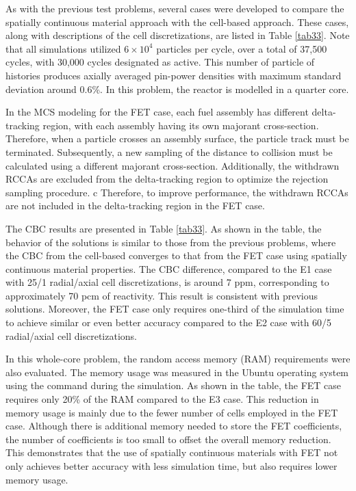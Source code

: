 As with the previous test problems, several cases were developed to compare the spatially continuous material approach with the cell-based approach. These cases, along with descriptions of the cell discretizations, are listed in Table \ref{tab33}. Note that all simulations utilized \(6 \times 10^4\) particles per cycle, over a total of 37,500 cycles, with 30,000 cycles designated as active. This number of particle of histories produces axially averaged pin-power densities with maximum standard deviation around 0.6\%. In this problem, the reactor is modelled in a quarter core.

In the MCS modeling for the FET case, each fuel assembly has different delta-tracking region, with each assembly having its own majorant cross-section. Therefore, when a particle crosses an assembly surface, the particle track must be terminated. Subsequently, a new sampling of the distance to collision must be calculated using a different majorant cross-section. Additionally, the withdrawn RCCAs are excluded from the delta-tracking region to optimize the rejection sampling procedure. c Therefore, to improve performance, the withdrawn RCCAs are not included in the delta-tracking region in the FET case.

The CBC results are presented in Table \ref{tab33}. As shown in the table, the behavior of the solutions is similar to those from the previous problems, where the CBC from the cell-based converges to that from the FET case using spatially continuous material properties. The CBC difference, compared to the E1 case with 25/1 radial/axial cell discretizations, is around 7 ppm, corresponding to approximately 70 pcm of reactivity. This result is consistent with previous solutions. Moreover, the FET case only requires one-third of the simulation time to achieve similar or even better accuracy compared to the E2 case with 60/5 radial/axial cell discretizations.

In this whole-core problem, the random access memory (RAM) requirements were also evaluated. The memory usage was measured in the Ubuntu operating system using the  command during the simulation. As shown in the table, the FET case requires only 20\% of the RAM compared to the E3 case. This reduction in memory usage is mainly due to the fewer number of cells employed in the FET case. Although there is additional memory needed to store the FET coefficients, the number of coefficients is too small to offset the overall memory reduction. This demonstrates that the use of spatially continuous materials with FET not only achieves better accuracy with less simulation time, but also requires lower memory usage.

